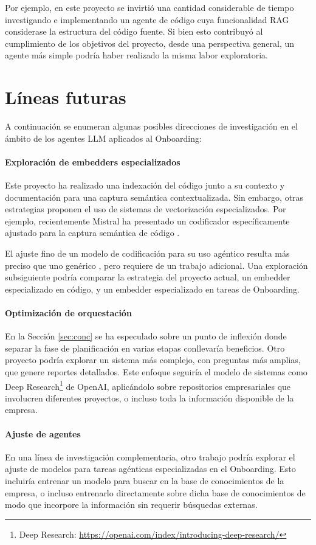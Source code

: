 Por ejemplo, en este proyecto se invirtió una cantidad considerable de tiempo investigando e implementando un agente de código cuya funcionalidad RAG considerase la estructura del código fuente. Si bien esto contribuyó al cumplimiento de los objetivos del proyecto, desde una perspectiva general, un agente más simple podría haber realizado la misma labor exploratoria.

\section{Líneas futuras}
A continuación se enumeran algunas posibles direcciones de investigación en el ámbito de los agentes LLM aplicados al Onboarding:
\paragraph{Exploración de embedders especializados} Este proyecto ha realizado una indexación del código junto a su contexto y documentación para una captura semántica contextualizada. Sin embargo, otras estrategias proponen el uso de sistemas de vectorización especializados. Por ejemplo, recientemente Mistral ha presentado un codificador específicamente ajustado para la captura semántica de código \cite{noauthor_codestral_nodate}.

El ajuste fino de un modelo de codificación para su uso agéntico resulta más preciso que uno genérico \cite{khattab_relevance-guided_2021,xiong_approximate_2020,yu_augmentation-adapted_2023}, pero requiere de un trabajo adicional. Una exploración subsiguiente podría comparar la estrategia del proyecto actual, un embedder especializado en código, y un embedder especializado en tareas de Onboarding.

\paragraph{Optimización de orquestación} En la Sección \ref{sec:conc} se ha especulado sobre un punto de inflexión donde separar la fase de planificación en varias etapas conllevaría beneficios. Otro proyecto podría explorar un sistema más complejo, con preguntas más amplias, que genere reportes detallados. Este enfoque seguiría el modelo de sistemas como Deep Research\footnote{Deep Research: \url{https://openai.com/index/introducing-deep-research/}} de OpenAI, aplicándolo sobre repositorios empresariales que involucren diferentes proyectos, o incluso toda la información disponible de la empresa.

\paragraph{Ajuste de agentes} En una línea de investigación complementaria, otro trabajo podría explorar el ajuste de modelos para tareas agénticas especializadas en el Onboarding. Esto incluiría entrenar un modelo para buscar en la base de conocimientos de la empresa, o incluso entrenarlo directamente sobre dicha base de conocimientos de modo que incorpore la información sin requerir búsquedas externas.
